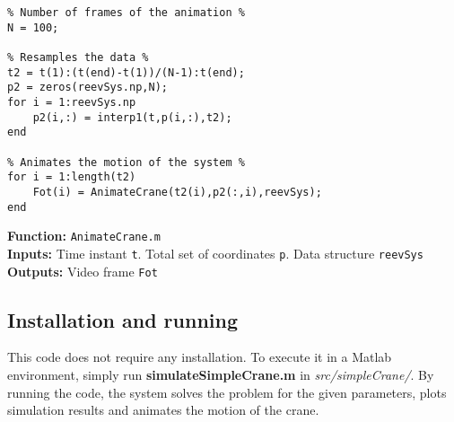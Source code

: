 {\begin{tcolorbox}\begin{lstlisting}[style=Matlab-editor]
% Animation of crane motion %
% Number of frames of the animation %
N = 100;

% Resamples the data %
t2 = t(1):(t(end)-t(1))/(N-1):t(end);
p2 = zeros(reevSys.np,N);
for i = 1:reevSys.np
    p2(i,:) = interp1(t,p(i,:),t2);
end

% Animates the motion of the system %
for i = 1:length(t2)
    Fot(i) = AnimateCrane(t2(i),p2(:,i),reevSys);
end
\end{lstlisting}\end{tcolorbox}}


\setlength{\parindent}{0cm}
\textbf{Function:} \texttt{AnimateCrane.m} \\
\textbf{Inputs:} Time instant \texttt{t}. Total set of coordinates \texttt{p}. Data structure \texttt{reevSys} \\
\textbf{Outputs:} Video frame \texttt{Fot} \\


\subsection{Installation and running}
 This code does not require any installation. To execute it in a Matlab environment, simply run \textbf{simulateSimpleCrane.m} in \textit{src/simpleCrane/}. By running the code, the system solves the problem for the given parameters, plots simulation results and animates the motion of the crane. 


\begin{comment}
\subsubsection{m-files description}
\texttt{CalculateAllCoordinates}: The main structure of the code can be found in 

\textbf{Parameters} The set of the coordinates of the reeving system \texttt{p}, time vector \texttt{t}, and the parameters of the system as \texttt{reevSys}.

\textbf{Returns} The animation of the simulation
\end{comment}




